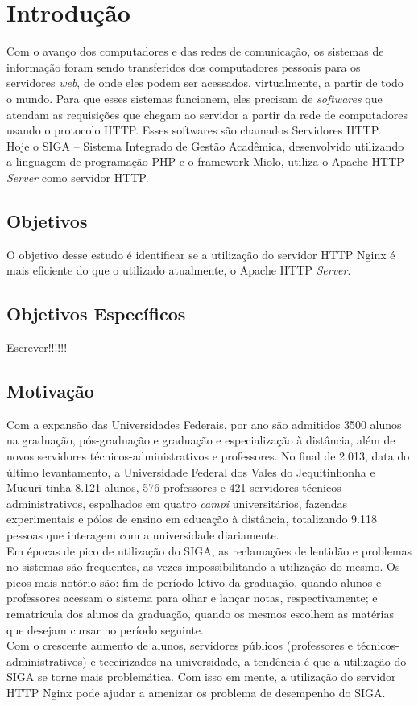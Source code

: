 \chapter{Introdução}\label{introducao}
Com o avanço dos computadores e das redes de comunicação, os sistemas de informação foram sendo transferidos dos computadores pessoais para os servidores \textit{web}, de onde eles podem ser acessados, virtualmente, a partir de todo o mundo. Para que esses sistemas funcionem, eles precisam de \textit{softwares} que atendam as requisições que chegam ao servidor a partir da rede de computadores usando o protocolo HTTP. Esses softwares são chamados Servidores HTTP.\\
Hoje o SIGA – Sistema Integrado de Gestão Acadêmica, desenvolvido utilizando a linguagem de programação PHP e o framework Miolo, utiliza o Apache HTTP \textit{Server} como servidor HTTP.\\

\section{Objetivos}
O objetivo desse estudo é identificar se a utilização do servidor HTTP Nginx é mais eficiente do que o utilizado atualmente, o Apache HTTP \textit{Server}.\\

\section{Objetivos Específicos}
Escrever!!!!!!

\section{Motivação}
Com a expansão das Universidades Federais, por ano são admitidos 3500 alunos na graduação, pós-graduação e graduação e especialização à distância, além de novos servidores técnicos-administrativos e professores. No final de 2.013, data do último levantamento, a Universidade Federal dos Vales do Jequitinhonha e Mucuri tinha 8.121 alunos, 576 professores e 421 servidores técnicos-administrativos, espalhados em quatro \textit{campi} universitários, fazendas experimentais e pólos de ensino em educação à distância, totalizando 9.118 pessoas que interagem com a universidade diariamente.\\
Em épocas de pico de utilização do SIGA, as reclamações de lentidão e problemas no sistemas são frequentes, as vezes impossibilitando a utilização do mesmo. Os picos mais notório são: fim de período letivo da graduação, quando alunos e professores acessam o sistema para olhar e lançar notas, respectivamente; e rematricula dos alunos da graduação, quando os mesmos escolhem as matérias que desejam cursar no período seguinte.\\
Com o crescente aumento de alunos, servidores públicos (professores e técnicos-administrativos) e teceirizados na universidade, a tendência é que a utilização do SIGA se torne mais problemática.
Com isso em mente, a utilização do servidor HTTP Nginx pode ajudar a amenizar os problema de desempenho do SIGA.\\

